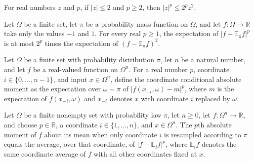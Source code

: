 \begin{theorem}
\label{FABL.abs_rpow_le_two_rpow_mul_sq}
\leanok
{}
For real numbers $z$ and $p$, if $|z|\le2$ and $p\ge2$, then $|z|^p\le 2^p z^2$.
\end{theorem}

\begin{theorem}
\label{FABL.pmfExpectation_abs_sub_mean_rpow_le_two_rpow_mul_sq}
\leanok
{}
Let $\Omega$ be a finite set, let $\pi$ be a probability mass function on $\Omega$, and
let $f:\Omega\to\mathbb R$ take only the values $-1$ and $1$. For every real $p\ge 1$,
the expectation of $|f-\mathbb E_\pi f|^p$ is at most $2^p$ times the expectation of
$(f-\mathbb E_\pi f)^2$.
\end{theorem}

\begin{definition}
\label{FABL.coordinateConditionalAbsMoment}
\leanok
{}
Let $\Omega$ be a finite set with probability distribution $\pi$, let $n$ be a natural
number, and let $f$ be a real-valued function on $\Omega^n$. For a real number $p$,
coordinate $i\in\{0,\ldots,n-1\}$, and input $x\in\Omega^n$, define the coordinate
conditional absolute moment as the expectation over $\omega\sim\pi$ of
$|f(x_{-i},\omega)-m|^p$, where $m$ is the expectation of $f(x_{-i},\omega)$ and
$x_{-i}$ denotes $x$ with coordinate $i$ replaced by $\omega$.
\end{definition}

\begin{theorem}
\label{FABL.coordinateConditionalAbsMoment_eq_coordinateProjection}
\leanok
{}
Let $\Omega$ be a finite nonempty set with probability law $\pi$, let $n\ge 0$, let
$f:\Omega^n\to\mathbb R$, and choose $p\in\mathbb R$, a coordinate $i\in\{1,\ldots,n\}$,
and $x\in\Omega^n$. The $p$th absolute moment of $f$ about its mean when only coordinate
$i$ is resampled according to $\pi$ equals the average, over that coordinate, of
$|f-\mathbb E_i f|^p$, where $\mathbb E_i f$ denotes the same coordinate average of $f$
with all other coordinates fixed at $x$.
\end{theorem}

